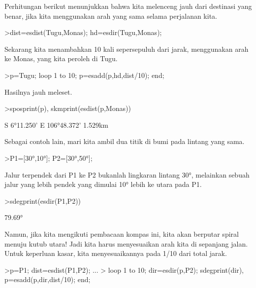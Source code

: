 \documentclass{article}
\newenvironment{eulernotebook}{\par}{\par}
\newenvironment{eulercomment}{\par\medskip}{\par\medskip}
\begin{document}
\begin{eulernotebook}
\begin{eulercomment}
\begin{eulercomment}
\begin{eulercomment}
\begin{eulercomment}
\begin{eulercomment}
Perhitungan berikut menunjukkan bahwa kita melenceng jauh dari
destinasi yang benar, jika kita menggunakan arah yang sama selama
perjalanan kita.
\end{eulercomment}
\begin{eulerprompt}
>dist=esdist(Tugu,Monas); hd=esdir(Tugu,Monas);
\end{eulerprompt}
\begin{eulercomment}
Sekarang kita menambahkan 10 kali sepersepuluh dari jarak, menggunakan
arah ke Monas, yang kita peroleh di Tugu.
\end{eulercomment}
\begin{eulerprompt}
>p=Tugu; loop 1 to 10; p=esadd(p,hd,dist/10); end;
\end{eulerprompt}
\begin{eulercomment}
Hasilnya jauh meleset.
\end{eulercomment}
\begin{eulerprompt}
>sposprint(p), skmprint(esdist(p,Monas))
\end{eulerprompt}
\begin{euleroutput}
  S 6°11.250' E 106°48.372'
       1.529km
\end{euleroutput}
\begin{eulercomment}
Sebagai contoh lain, mari kita ambil dua titik di bumi pada lintang
yang sama.
\end{eulercomment}
\begin{eulerprompt}
>P1=[30°,10°]; P2=[30°,50°];
\end{eulerprompt}
\begin{eulercomment}
Jalur terpendek dari P1 ke P2 bukanlah lingkaran lintang 30°,
melainkan sebuah jalur yang lebih pendek yang dimulai 10° lebih ke
utara pada P1.
\end{eulercomment}
\begin{eulerprompt}
>sdegprint(esdir(P1,P2))
\end{eulerprompt}
\begin{euleroutput}
       79.69°
\end{euleroutput}
\begin{eulercomment}
Namun, jika kita mengikuti pembacaan kompas ini, kita akan berputar
spiral menuju kutub utara! Jadi kita harus menyesuaikan arah kita di
sepanjang jalan. Untuk keperluan kasar, kita menyesuaikannya pada 1/10
dari total jarak.
\end{eulercomment}
\begin{eulerprompt}
>p=P1;  dist=esdist(P1,P2); ...
>  loop 1 to 10; dir=esdir(p,P2); sdegprint(dir), p=esadd(p,dir,dist/10); end;

\end{eulerprompt}
\end{eulercomment}
\end{eulercomment}
\end{eulercomment}
\end{eulercomment}
\end{eulernotebook}
\end{document}
